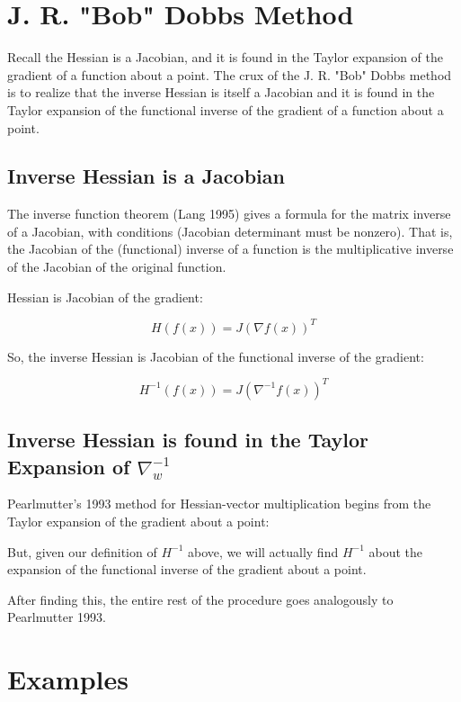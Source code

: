 \documentclass{article}
\begin{document}
\section{J. R. "Bob" Dobbs Method}

Recall the Hessian is a Jacobian, and it is found in the Taylor expansion of the gradient of a function about a point. The crux of the J. R. "Bob" Dobbs method is to realize that the inverse Hessian is itself a Jacobian and it is found in the Taylor expansion of the functional inverse of the gradient of a function about a point.

\subsection{Inverse Hessian is a Jacobian}

The inverse function theorem (Lang 1995) gives a formula for the matrix inverse of a Jacobian, with conditions (Jacobian determinant must be nonzero). That is, the Jacobian of the (functional) inverse of a function is the multiplicative inverse of the Jacobian of the original function.

Hessian is Jacobian of the gradient:

$$H(f(x)) = J(\nabla f(x))^T $$

So, the inverse Hessian is Jacobian of the functional inverse of the gradient:

$$H^{-1}(f(x)) = J(\nabla^{-1} f(x))^T $$

\subsection{Inverse Hessian is found in the Taylor Expansion of $\nabla_w^{-1}$}

Pearlmutter's 1993 method for Hessian-vector multiplication begins from the Taylor expansion of the gradient about a point:


But, given our definition of $H^{-1}$ above, we will actually find $H^{-1}$ about the expansion of the functional inverse of the gradient about a point.


After finding this, the entire rest of the procedure goes analogously to Pearlmutter 1993.


\section{Examples}
\end{document}
